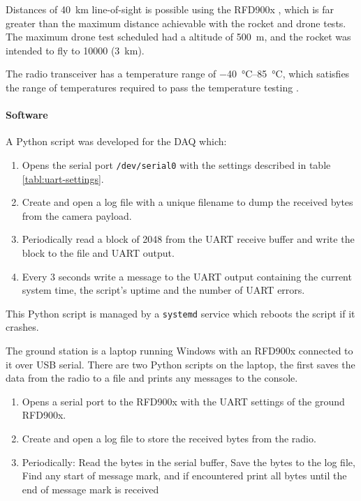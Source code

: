 \documentclass{report}
\begin{document}
Distances of \SI{40}{\kilo\metre} line-of-sight is possible using the RFD900x \cite{rfdesign2020rfd900x}, which is far greater than the maximum distance achievable with the rocket and drone tests. The maximum drone test scheduled had a altitude of \SI{500}{\metre}, and the rocket was intended to fly to \SI{10000}{\feet} (\SI{3}{\kilo\metre}).




The radio transceiver has a temperature range of \SIrange{-40}{85}{\degreeCelsius}, which satisfies the range of temperatures required to pass the temperature testing \cite{rfdesign2020rfd900x}.


\paragraph{Software}

A Python script was developed for the DAQ which:

\begin{enumerate}
  \item Opens the serial port \texttt{/dev/serial0} with the settings described in table \ref{tabl:uart-settings}.
  \item Create and open a log file with a unique filename to dump the received bytes from the camera payload.
  \item Periodically read a block of 2048 from the UART receive buffer and write the block to the file and UART output.
  \item Every 3 seconds write a message to the UART output containing the current system time, the script's uptime and the number of UART errors.
\end{enumerate}

This Python script is managed by a \texttt{systemd} service which reboots the script if it crashes.

The ground station is a laptop running Windows with an RFD900x connected to it over USB serial. There are two Python scripts on the laptop, the first saves the data from the radio to a file and prints any messages to the console.

\begin{enumerate}
  \item Opens a serial port to the RFD900x with the UART settings of the ground RFD900x.
  \item Create and open a log file to store the received bytes from the radio.
  \item Periodically:
        \subitem Read the bytes in the serial buffer,
        \subitem Save the bytes to the log file,
        \subitem Find any start of message mark, and if encountered print all bytes until the end of message mark is received
\end{enumerate}
\end{document}
